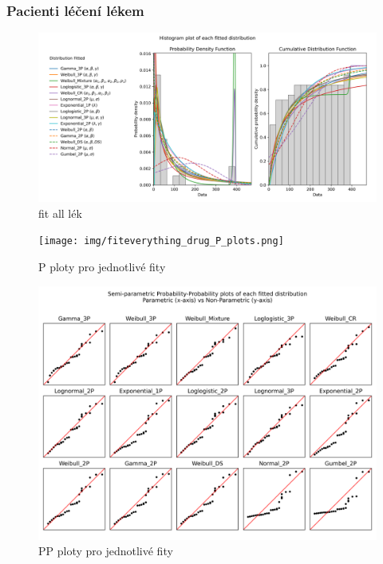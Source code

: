 \documentclass[a4, 11pt]{article}
\theoremstyle{definition}
\theoremstyle{remark}
\begin{document}
	
	\subsubsection{Pacienti léčení lékem} \label{sec:parametric_drugs}
	
	\begin{figure}[H]
		\centering
		\includegraphics[width=1.0\linewidth]{img/fiteverything_drugs_histogram.png}
		\caption{fit all lék}
		\label{fig:fit_everything_hist_drugs}
	\end{figure}

	\begin{figure}[H]
		\centering
		\texttt{[image: img/fiteverything\_drug\_P\_plots.png]}
		\caption{P ploty pro jednotlivé fity}
		\label{fig:fit_everything_drug_P_plots}
	\end{figure}
	
	\begin{figure}[H]
		\centering
		\includegraphics[width=0.9\linewidth]{img/fiteverything_drug_PP_plots.png}
		\caption{PP ploty pro jednotlivé fity}
		\label{fig:fit_everything_drug_PP_plots}
	\end{figure}
	
\end{document}
